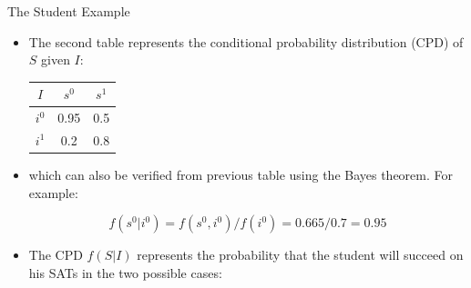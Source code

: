 \documentclass[handout]{beamer}
\begin{document}
\begin{frame}{The Student Example}
\scriptsize{
\begin{itemize}

\item The second table represents the conditional probability distribution (CPD) of $S$ given $I$:

\begin{table}
\centering
  \begin{tabular}{c||cc} \hline
$I$ & $s^0$ & $s^1$  \\ \hline
$i^0$ & 0.95 & 0.5 \\
$i^1$ & 0.2 & 0.8 \\

\end{tabular} 
\end{table}

\item which can also be verified from previous table using the Bayes theorem. For example:

\begin{displaymath}
f(s^{0}|i^0)=f(s^{0},i^0)/f(i^0)= 0.665/0.7=0.95
\end{displaymath}

\item The CPD $f(S | I)$ represents the probability that the student will succeed on his SATs in the two possible cases:


\end{itemize}



} 

\end{frame}
\end{document}
